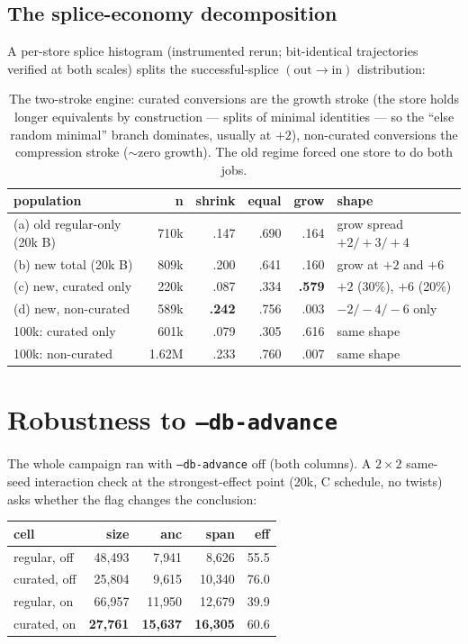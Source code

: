 \documentclass[11pt]{article}
\newcommand{\code}[1]{\texttt{#1}}
\begin{document}
\subsection{The splice-economy decomposition}

A per-store splice histogram (instrumented rerun; bit-identical
trajectories verified at both scales) splits the successful-splice
$(\mathrm{out} \to \mathrm{in})$ distribution:

\begin{table}[h]\centering\small
\begin{tabular}{lrrrrl}
\toprule
population & n & shrink & equal & grow & shape \\
\midrule
(a) old regular-only (20k B) & 710k & .147 & .690 & .164 & grow spread $+2/+3/+4$ \\
(b) new total (20k B) & 809k & .200 & .641 & .160 & grow at $+2$ and $+6$ \\
(c) new, curated only & 220k & .087 & .334 & \textbf{.579} & $+2$ (30\%), $+6$ (20\%) \\
(d) new, non-curated & 589k & \textbf{.242} & .756 & .003 & $-2/-4/-6$ only \\
\midrule
100k: curated only & 601k & .079 & .305 & .616 & same shape \\
100k: non-curated & 1.62M & .233 & .760 & .007 & same shape \\
\bottomrule
\end{tabular}
\caption{The two-stroke engine: curated conversions are the growth stroke
(the store holds longer equivalents by construction --- splits of minimal
identities --- so the ``else random minimal'' branch dominates, usually at
$+2$), non-curated conversions the compression stroke ($\sim$zero growth).
The old regime forced one store to do both jobs.}
\end{table}

\section{Robustness to \code{--db-advance}}

The whole campaign ran with \code{--db-advance} off (both columns). A
$2{\times}2$ same-seed interaction check at the strongest-effect point
(20k, C schedule, no twists) asks whether the flag changes the conclusion:

\begin{center}\small
\begin{tabular}{lrrrr}
\toprule
cell & size & anc & span & eff \\
\midrule
regular, off & 48{,}493 & 7{,}941 & 8{,}626 & 55.5 \\
curated, off & 25{,}804 & 9{,}615 & 10{,}340 & 76.0 \\
regular, on & 66{,}957 & 11{,}950 & 12{,}679 & 39.9 \\
curated, on & \textbf{27{,}761} & \textbf{15{,}637} & \textbf{16{,}305} & 60.6 \\
\bottomrule
\end{tabular}
\end{center}
\end{document}
